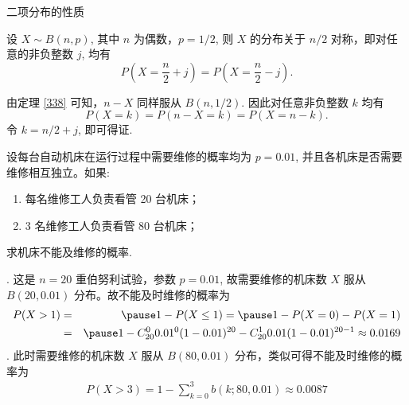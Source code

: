\documentclass[Prob-All.tex]{subfiles}
\begin{document}
\begin{frame}{二项分布的性质}

	\begin{thm} 设 $X\sim B (n,p)$, 其中 $n$ 为偶数，$p=1/2$, 则 $X$ 的分布关于 $n/2$ 对称，即对任意的非负整数 $j$, 均有
		$$P(X=\frac{n}{2}+j)=P(X=\frac{n}{2}-j).$$
	\end{thm}
	\pause

	\begin{jieda} 由定理 \ref{338} 可知，$n-X$ 同样服从 $B (n,1/2)$. \pause 因此对任意非负整数 $k$ 均有
		$$P(X=k)=P(n-X=k)=P(X=n-k).$$
		\pause
		令 $k=n/2+j$, 即可得证. %
	\end{jieda}

\end{frame}






\begin{frame}
	\vspace{0.4cm}
	\begin{exam}
		设每台自动机床在运行过程中需要维修的概率均为 $p=0.01$, 并且各机床是否需要维修相互独立。如果:
		\begin{enumerate}
			\item 每名维修工人负责看管 20 台机床；
			\item 3 名维修工人负责看管 80 台机床；
		\end{enumerate}
		求机床不能及维修的概率.
	\end{exam}

	\pause {}. 这是 $n=20$ 重伯努利试验，参数 $p=0.01$, 故需要维修的机床数 $X$ 服从 $B (20,0.01)$ 分布。故不能及时维修的概率为 \pause
	\begin{eqnarray*}
		P(X>1)&=&\pause 1-P(X\le 1)=\pause 1-P(X=0)-P(X=1)\\
		&=&\pause 1-C_{20}^00.01^0(1-0.01)^{20}-C_{20}^10.01(1-0.01)^{20-1}\approx 0.0169
	\end{eqnarray*}
	. 此时需要维修的机床数 $X$ 服从 $B (80,0.01)$ 分布，类似可得不能及时维修的概率为
	\begin{eqnarray*}
		P(X>3)=1-\sum_{k=0}^3b(k;80,0.01)\approx 0.0087
	\end{eqnarray*}

\end{frame}
\end{document}
